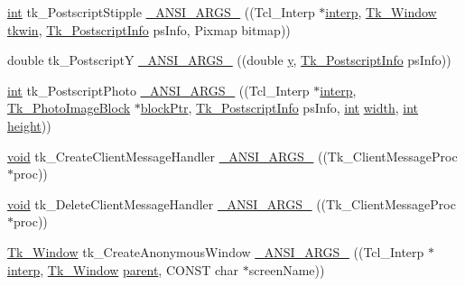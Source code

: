\begin{DoxyCompactItemize}
\item 
\hyperlink{tk_8h_a83f82f76e7fed06f4c49d2db94028a6d}{int} tk\+\_\+\+Postscript\+Stipple \hyperlink{struct_tk_stubs_a1a37d6c7d7db977fcb941ffda904f2a5}{\+\_\+\+A\+N\+S\+I\+\_\+\+A\+R\+G\+S\+\_\+} ((Tcl\+\_\+\+Interp $\ast$\hyperlink{tk_8h_a5ab79c0f5849ee8e6a2e955a6c536cc0}{interp}, \hyperlink{tk_8h_ab756137de3ee74edc2501bd0d761e37c}{Tk\+\_\+\+Window} \hyperlink{tk_8h_a35df722e7e1b6efd651683b8be7c1490}{tkwin}, \hyperlink{tk_8h_abbbe48b566673bbd7f1d88a4e7ea1f69}{Tk\+\_\+\+Postscript\+Info} ps\+Info, Pixmap bitmap))
\item 
double tk\+\_\+\+PostscriptY \hyperlink{struct_tk_stubs_aab5c2bfc0b6a4489e98849d48365f50c}{\+\_\+\+A\+N\+S\+I\+\_\+\+A\+R\+G\+S\+\_\+} ((double \hyperlink{tk_8h_a40f4f3601c0eaa8ca46b1a164264696d}{y}, \hyperlink{tk_8h_abbbe48b566673bbd7f1d88a4e7ea1f69}{Tk\+\_\+\+Postscript\+Info} ps\+Info))
\item 
\hyperlink{tk_8h_a83f82f76e7fed06f4c49d2db94028a6d}{int} tk\+\_\+\+Postscript\+Photo \hyperlink{struct_tk_stubs_a6a360201eaef3a5a8066df93bfef342b}{\+\_\+\+A\+N\+S\+I\+\_\+\+A\+R\+G\+S\+\_\+} ((Tcl\+\_\+\+Interp $\ast$\hyperlink{tk_8h_a5ab79c0f5849ee8e6a2e955a6c536cc0}{interp}, \hyperlink{struct_tk___photo_image_block}{Tk\+\_\+\+Photo\+Image\+Block} $\ast$\hyperlink{tk_8h_ad9894239163ee938b57f0c9d6a659af9}{block\+Ptr}, \hyperlink{tk_8h_abbbe48b566673bbd7f1d88a4e7ea1f69}{Tk\+\_\+\+Postscript\+Info} ps\+Info, \hyperlink{tk_8h_a83f82f76e7fed06f4c49d2db94028a6d}{int} \hyperlink{tk_8h_a29e50a5401c1396b3a2aa3487f74d468}{width}, \hyperlink{tk_8h_a83f82f76e7fed06f4c49d2db94028a6d}{int} \hyperlink{tk_8h_a67be2f4b9d9c5b3559139bfb072e2e81}{height}))
\item 
\hyperlink{tk_8h_aba408b7cd755a96426e004c015f5de8e}{void} tk\+\_\+\+Create\+Client\+Message\+Handler \hyperlink{struct_tk_stubs_a09664a71e608313da2098a810e269f91}{\+\_\+\+A\+N\+S\+I\+\_\+\+A\+R\+G\+S\+\_\+} ((Tk\+\_\+\+Client\+Message\+Proc $\ast$proc))
\item 
\hyperlink{tk_8h_aba408b7cd755a96426e004c015f5de8e}{void} tk\+\_\+\+Delete\+Client\+Message\+Handler \hyperlink{struct_tk_stubs_a0935b2b03cb655b8d501c2ecddcefbf0}{\+\_\+\+A\+N\+S\+I\+\_\+\+A\+R\+G\+S\+\_\+} ((Tk\+\_\+\+Client\+Message\+Proc $\ast$proc))
\item 
\hyperlink{tk_8h_ab756137de3ee74edc2501bd0d761e37c}{Tk\+\_\+\+Window} tk\+\_\+\+Create\+Anonymous\+Window \hyperlink{struct_tk_stubs_a87eac524b3902b620a97b1c566bd331f}{\+\_\+\+A\+N\+S\+I\+\_\+\+A\+R\+G\+S\+\_\+} ((Tcl\+\_\+\+Interp $\ast$\hyperlink{tk_8h_a5ab79c0f5849ee8e6a2e955a6c536cc0}{interp}, \hyperlink{tk_8h_ab756137de3ee74edc2501bd0d761e37c}{Tk\+\_\+\+Window} \hyperlink{tk_8h_a5bd0fe2ecadcfa6c142914cb359aea47}{parent}, C\+O\+N\+ST char $\ast$screen\+Name))

\end{DoxyCompactItemize}
